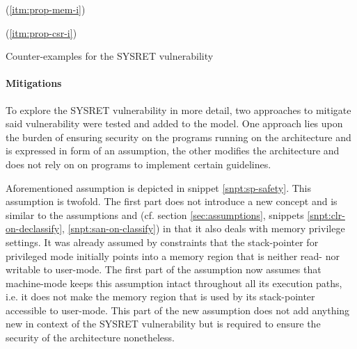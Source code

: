 \begin{table}
    \begin{subtable}{\textwidth}
        \centering
        
        \caption{ (\ref{itm:prop-mem-i})}
        \label{tbl:cex-mem-i-sysret}
    \end{subtable}

    \begin{subtable}{\textwidth}
        \centering
        
        \caption{ (\ref{itm:prop-csr-i})}
        \label{tbl:cex-csr-i-sysret}
    \end{subtable}
    \caption{Counter-examples for the SYSRET vulnerability}
    \label{tbl:cex-sysret}
\end{table}

\paragraph{Mitigations}

To explore the SYSRET vulnerability in more detail, two approaches to mitigate said vulnerability were tested and added to the model.
One approach lies upon the burden of ensuring security on the programs running on the architecture and is expressed in form of an assumption, the other modifies the architecture and does not rely on on programs to implement certain guidelines.

Aforementioned assumption is depicted in snippet \ref{snpt:sp-safety}.
This assumption is twofold.
The first part does not introduce a new concept and is similar to the assumptions  and  (cf. section \ref{sec:assumptions}, snippets \ref{snpt:clr-on-declassify}, \ref{snpt:san-on-classify}) in that it also deals with memory privilege settings.
It was already assumed by  constraints that the stack-pointer for privileged mode initially points into a memory region that is neither read- nor writable to user-mode.
The first part of the assumption  now assumes that machine-mode keeps this assumption intact throughout all its execution paths, i.e. it does not make the memory region that is used by its stack-pointer accessible to user-mode.
This part of the new assumption does not add anything new in context of the SYSRET vulnerability but is required to ensure the security of the architecture nonetheless.


